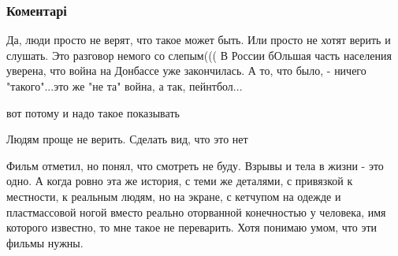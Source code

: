  
 
 
 
 
\subsubsection{Коментарі}

\begin{itemize}
 

Да, люди просто не верят, что такое может быть. Или просто не хотят верить и
слушать. Это разговор немого со слепым((( В России бОльшая часть населения
уверена, что война на Донбассе уже закончилась. А то, что было, - ничего
"такого"...это же "не та" война, а так, пейнтбол...


 
вот потому и надо такое показывать

 
Людям проще не верить. Сделать вид, что это нет

 

Фильм отметил, но понял, что смотреть не буду. Взрывы и тела в жизни - это
одно. А когда ровно эта же история, с теми же деталями, с привязкой к
местности, к реальным людям, но на экране, с кетчупом на одежде и пластмассовой
ногой вместо реально оторванной конечностью у человека, имя которого известно,
то мне такое не переварить. Хотя понимаю умом, что эти фильмы нужны.



\end{itemize}
